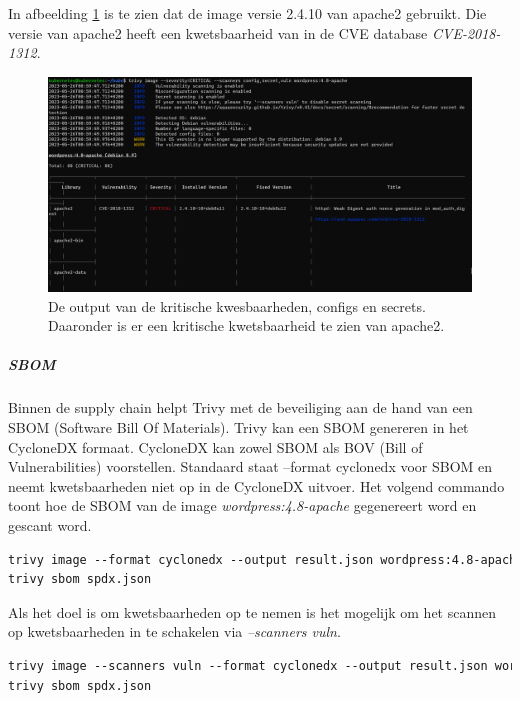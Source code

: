 In afbeelding \ref{fig:TrivyWordpresCriticalScan} is te zien dat de image versie 2.4.10 van apache2 gebruikt. Die versie van apache2 heeft een kwetsbaarheid van in de CVE database \textit{CVE-2018-1312}. 
\begin{flushleft}
    \begin{figure}[h]
        \includegraphics[width=.95\textwidth]{graphics/trivyapachekritisch.png}
        \caption{\label{fig:TrivyWordpresCriticalScan}De output van de kritische kwesbaarheden, configs en secrets. Daaronder is er een kritische kwetsbaarheid te zien van apache2.}
    \end{figure} 
\end{flushleft}

\subparagraph{SBOM}
Binnen de supply chain helpt Trivy met de beveiliging aan de hand van een SBOM (Software Bill Of Materials). Trivy kan een SBOM genereren in het CycloneDX formaat. CycloneDX kan zowel SBOM als BOV (Bill of Vulnerabilities) voorstellen. Standaard staat --format cyclonedx voor SBOM en neemt kwetsbaarheden niet op in de CycloneDX uitvoer. Het volgend commando toont hoe de SBOM van de image \textit{wordpress:4.8-apache} gegenereert word en gescant word.
\begin{lstlisting}[language=tex, caption={SBOM scannen en analyseren met Trivy}]
trivy image --format cyclonedx --output result.json wordpress:4.8-apache
trivy sbom spdx.json
\end{lstlisting}

Als het doel is om kwetsbaarheden op te nemen is het mogelijk om het scannen op kwetsbaarheden in te schakelen via \textit{--scanners vuln}.
\begin{lstlisting}[language=tex, caption={SBOM scannen en analyseren met Trivy en kwetsbaarheden inschakelen}]
trivy image --scanners vuln --format cyclonedx --output result.json wordpress:4.8-apache
trivy sbom spdx.json
\end{lstlisting}

